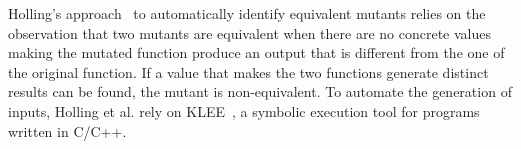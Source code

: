 Holling's approach~\cite{holling2016nequivack} to automatically identify equivalent mutants relies on the observation that 
two mutants are equivalent when there are no concrete values making the mutated function produce an output that is different from the one of the original function.
If a value that makes the two functions generate distinct results can be found, the mutant is non-equivalent.
To automate the generation of inputs, Holling et al. rely on KLEE~\cite{cadar2008klee}, a symbolic execution tool for programs written in C/C++.

